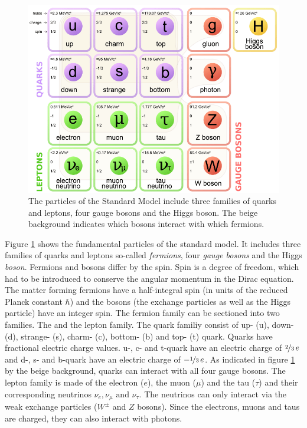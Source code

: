 \documentclass[a4paper,11pt,twosided,final,german,openbib,pdftex,listof=totoc,bibliography=totoc]{scrbook}
\begin{document}
\begin{figure}[h!]
	\centering
	\includegraphics[width=\textwidth]{Bilder/SM.png}
	\caption[Standard Model]{The particles of the Standard Model include three families of quarks and leptons, four gauge bosons and the Higgs boson. The beige background indicates which bosons interact with which fermions. \cite{SMFigure}}
	\label{fig:SM}
\end{figure}



Figure \ref{fig:SM} shows the fundamental particles of the standard model. It includes three families of quarks and leptons so-called \textit{fermions}, four \textit{gauge bosons} and the Higgs \textit{boson}. Fermions and bosons differ by the spin. Spin is a degree of freedom, which had to be introduced to conserve the angular momentum in the Dirac equation. The matter forming fermions have a half-integral spin (in units of the reduced Planck constant $\hbar$) and the bosons (the exchange particles as well as the Higgs particle) have an integer spin. The fermion family can be sectioned into two families. The  and the lepton family. 
The quark familiy consist of up- (u), down- (d), strange- (s), charm- (c), bottom- (b) and top- (t) quark. Quarks have fractional electric charge values. u-, c- and t-quark have an electric charge of $\nicefrac{2}{3} \,e$ and d-, s- and b-quark have an electric charge of $-\nicefrac{1}{3} \,e$. As indicated in figure \ref{fig:SM} by the beige background, quarks can interact with all four gauge bosons.
The lepton family is made of the electron ($e$), the muon ($\mu$) and the tau ($\tau$) and their corresponding neutrinos $\nu_e,\nu_{\mu} \textrm{ and } \nu_{\tau}$. The neutrinos can only interact via the weak exchange particles ($W^{\pm}$ and $Z$ bosons). Since the electrons, muons and taus are charged, they can also interact with photons.
\end{document}
